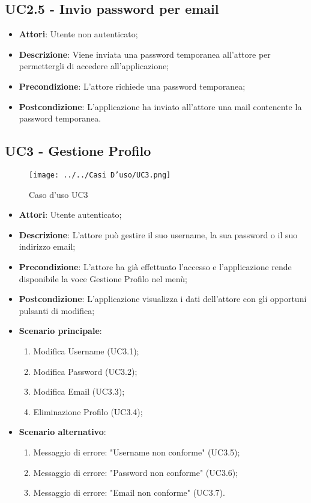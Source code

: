 \subsection{UC2.5 - Invio password per email} 
\label{ssec:UC2.5} 
\begin{itemize} 
\item \textbf{Attori}: Utente non autenticato;
\item \textbf{Descrizione}: Viene inviata una password temporanea all'attore per permettergli di accedere all'applicazione;
\item \textbf{Precondizione}: L'attore richiede una password temporanea;
\item \textbf{Postcondizione}: L'applicazione ha inviato all'attore una mail contenente la password temporanea.
\end{itemize} 
\newpage
\subsection{UC3 - Gestione Profilo} 
\label{ssec:UC3} 
\begin{figure}[h!] 
\centering 
\texttt{[image: ../../Casi D'uso/UC3.png]} 
\caption{Caso d'uso UC3} 
 \end{figure} 
\begin{itemize} 
\item \textbf{Attori}: Utente autenticato;
\item \textbf{Descrizione}: L'attore può gestire il suo username, la sua password o il suo indirizzo email;
\item \textbf{Precondizione}: L'attore ha già effettuato l'accesso e l'applicazione rende disponibile la voce Gestione Profilo nel menù;
\item \textbf{Postcondizione}: L'applicazione visualizza i dati dell'attore con gli opportuni pulsanti di modifica;
\item \textbf{Scenario principale}: 
	\begin{enumerate}\item Modifica Username (UC3.1);\item Modifica Password (UC3.2);\item Modifica Email (UC3.3);\item Eliminazione Profilo (UC3.4);\end{enumerate}
\item \textbf{Scenario alternativo}: 
	\begin{enumerate} \item Messaggio di errore: "Username non conforme" (UC3.5);\item Messaggio di errore: "Password non conforme" (UC3.6);\item Messaggio di errore: "Email non conforme" (UC3.7). 
	\end{enumerate}
\end{itemize} 
